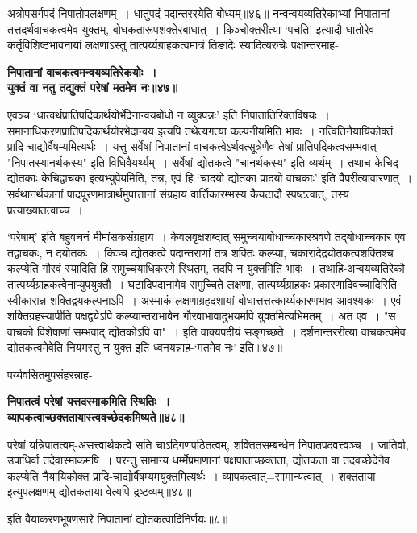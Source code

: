 {{{{अत्रोपसर्गपदं निपातोपलक्षणम्~।
धातुपदं पदान्तररयेति बोध्यम्॥४६॥
 नन्वन्वयव्यतिरेकाभ्यां निपातानां तत्तदर्थवाचकत्वमेव युक्तम्, बोधकतारूपशक्तेरबाधात्~।
किञ्चोक्तरीत्या `पचति' इत्यादौ धातोरेव कर्तृविशिष्टभावनायां लक्षणाऽस्तु तात्पर्य्यग्राहकत्वमात्रं तिङादेः स्यादित्यरुचेः पक्षान्तरमाह-
\begin{center}{\bfseries निपातानां वाचकत्वमन्वयव्यतिरेकयोः~।\\
 युक्तं वा नतु तद्युक्तं परेषां मतमेव नः॥४७॥}\end{center}

 एवञ्च `धात्वर्थप्रातिपदिकार्थयोर्भेदेनान्वयबोधो न व्युक्पन्नः' इति निपातातिरिक्तविषयः~।
समानाधिकरणप्रातिपदिकार्थयोरभेदान्वय इत्यपि तथेत्यगत्या कल्पनीयमिति भावः~।
नत्वितिनैयायिकोक्तं प्रादि-चाद्योर्वैषम्यमित्यर्थः~।
 यत्तु-सर्वेषां निपातानां वाचकत्वेऽर्थवत्सूत्रेणैव तेषां प्रातिपदिकत्वसम्भवात् "निपातस्यानर्थकस्य" इति विधिवैयर्थ्यम्~।
 सर्वेषां द्योतकत्वे "चानर्थकस्य" इति व्यर्थम्~।
तथाच केचिद् द्योतकाः केचिद्वाचका इत्यभ्युपेयमिति, तन्न, एवं हि `चादयो द्योतका प्रादयो वाचकाः' इति वैपरीत्यावारणात्~।
सर्वथानर्थकानां पादपूरणमात्रार्थमुपात्तानां संग्रहाय वार्त्तिकारम्भस्य कैयटादौ स्पष्टत्वात्, तस्य प्रत्याख्यातत्वाच्च~।

 `परेषाम्' इति बहुवचनं मीमांसकसंग्रहाय~।
केवलवृक्षशब्दात् समुच्चयाबोधाच्चकारश्रवणे तद्बोधाच्चकार एव तद्वाचकः, न दयोतकः~।
किञ्च द्योतकत्वे पदान्तराणां तत्र शक्तिः कल्प्या, चकारादेद्र्योतकत्वशक्तिश्च कल्प्येति गौरवं स्यादिति हि समुच्चयाधिकरणे स्थितम्, तदपि न युक्तमिति भावः~।
 तथाहि-अन्वयव्यतिरेकौ तात्पर्य्यग्राहकत्वेनाप्युपयुक्तौ~।
घटादिपदानामेव समुच्चिते लक्षणा, तात्पर्य्यग्राहकः प्रकारणादिवच्चादिरिति स्वीकारान्न शक्तिद्वयकल्पनाऽपि~।
अस्माकं लक्षणाग्रहदशायां बोधात्तत्तत्कार्य्यकारणभाव आवश्यकः~।
एवं शक्तिग्रहस्यापीति पक्षद्वयेऽपि कल्प्यान्तराभावेन गौरवाभावादुभयमपि युक्तमित्यभिमतम्~।
 अत एव~।
"स वाचको विशेषाणां सम्भवाद् द्योतकोऽपि वा"~।
 इति वाक्यपदीयं सङ्गच्छते~।
दर्शनान्तररीत्या वाचकत्वमेव द्योतकत्वमेवेति नियमस्तु न युक्त इति ध्वनयन्नाह-`मतमेव नः' इति॥४७॥

पर्य्यवसितमुपसंहरन्नाह-
\begin{center}{\bfseries निपातत्वं परेषां यत्तदस्माकमिति स्थितिः~।\\
 व्यापकत्वाच्छक्ततायास्त्ववच्छेदकमिष्यते॥४८॥}\end{center}

 परेषां यन्निपातत्वम्-असत्त्वार्थकत्वे सति चाऽदिगणपठितत्वम्, शक्तितसम्बन्धेन निपातपदवत्त्वञ्च~।
जातिर्वा, उपाधिर्वा तदेवास्माकमषि~।
परन्तु सामान्य धर्म्मेप्रमाणानां पक्षपाताच्छक्तता, द्योतकता वा तदवच्छेदेनैव कल्प्येति नैयायिकोक्त प्रादि-चाद्योर्वैषम्यमयुक्तमित्यर्थः~।
व्यापकत्वात्=सामान्यत्वात्~।
शक्तताया इत्युपलक्षणम्-द्योतकताया वेत्यपि द्रष्टव्यम्॥४८॥
 \begin{center}इति वैयाकरणभूषणसारे निपातानां द्योतकत्वादिनिर्णयः॥८॥\end{center}
}}}}
